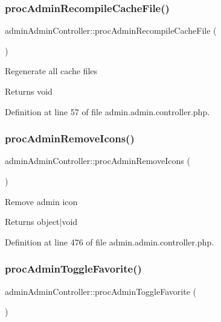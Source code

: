 \subsubsection{\texorpdfstring{proc\+Admin\+Recompile\+Cache\+File()}{procAdminRecompileCacheFile()}}
{\footnotesize\ttfamily admin\+Admin\+Controller\+::proc\+Admin\+Recompile\+Cache\+File (\begin{DoxyParamCaption}{ }\end{DoxyParamCaption})}

Regenerate all cache files \begin{DoxyReturn}{Returns}
void 
\end{DoxyReturn}


Definition at line 57 of file admin.\+admin.\+controller.\+php.

\mbox{\label{classadminAdminController_a9ddaddf87c06a8ef329ddc0d4305f5d1}} 
\subsubsection{\texorpdfstring{proc\+Admin\+Remove\+Icons()}{procAdminRemoveIcons()}}
{\footnotesize\ttfamily admin\+Admin\+Controller\+::proc\+Admin\+Remove\+Icons (\begin{DoxyParamCaption}{ }\end{DoxyParamCaption})}

Remove admin icon \begin{DoxyReturn}{Returns}
object$\vert$void 
\end{DoxyReturn}


Definition at line 476 of file admin.\+admin.\+controller.\+php.

\mbox{\label{classadminAdminController_ab7075e4e561ebf87b4d06418638d52ab}} 
\subsubsection{\texorpdfstring{proc\+Admin\+Toggle\+Favorite()}{procAdminToggleFavorite()}}
{\footnotesize\ttfamily admin\+Admin\+Controller\+::proc\+Admin\+Toggle\+Favorite (\begin{DoxyParamCaption}{ }\end{DoxyParamCaption})}

